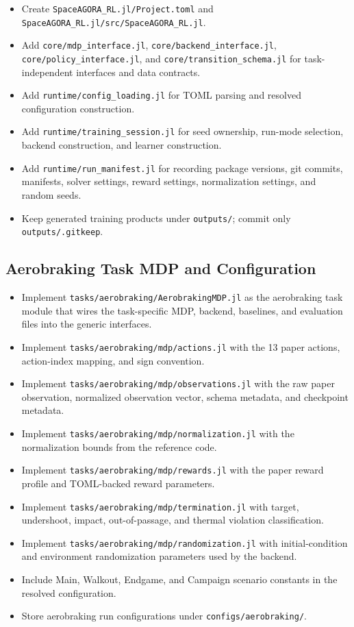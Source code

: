 \documentclass[11pt]{article}
\begin{document}
\begin{itemize}
\item Create \texttt{SpaceAGORA\_RL.jl/Project.toml} and \texttt{SpaceAGORA\_RL.jl/src/SpaceAGORA\_RL.jl}.
\item Add \texttt{core/mdp\_interface.jl}, \texttt{core/backend\_interface.jl}, \texttt{core/policy\_interface.jl}, and \texttt{core/transition\_schema.jl} for task-independent interfaces and data contracts.
\item Add \texttt{runtime/config\_loading.jl} for TOML parsing and resolved configuration construction.
\item Add \texttt{runtime/training\_session.jl} for seed ownership, run-mode selection, backend construction, and learner construction.
\item Add \texttt{runtime/run\_manifest.jl} for recording package versions, git commits, manifests, solver settings, reward settings, normalization settings, and random seeds.
\item Keep generated training products under \texttt{outputs/}; commit only \texttt{outputs/.gitkeep}.
\end{itemize}

\subsection{Aerobraking Task MDP and Configuration}

\begin{itemize}
\item Implement \texttt{tasks/aerobraking/AerobrakingMDP.jl} as the aerobraking task module that wires the task-specific MDP, backend, baselines, and evaluation files into the generic interfaces.
\item Implement \texttt{tasks/aerobraking/mdp/actions.jl} with the 13 paper actions, action-index mapping, and sign convention.
\item Implement \texttt{tasks/aerobraking/mdp/observations.jl} with the raw paper observation, normalized observation vector, schema metadata, and checkpoint metadata.
\item Implement \texttt{tasks/aerobraking/mdp/normalization.jl} with the normalization bounds from the reference code.
\item Implement \texttt{tasks/aerobraking/mdp/rewards.jl} with the paper reward profile and TOML-backed reward parameters.
\item Implement \texttt{tasks/aerobraking/mdp/termination.jl} with target, undershoot, impact, out-of-passage, and thermal violation classification.
\item Implement \texttt{tasks/aerobraking/mdp/randomization.jl} with initial-condition and environment randomization parameters used by the backend.
\item Include Main, Walkout, Endgame, and Campaign scenario constants in the resolved configuration.
\item Store aerobraking run configurations under \texttt{configs/aerobraking/}.
\end{itemize}
\end{document}
